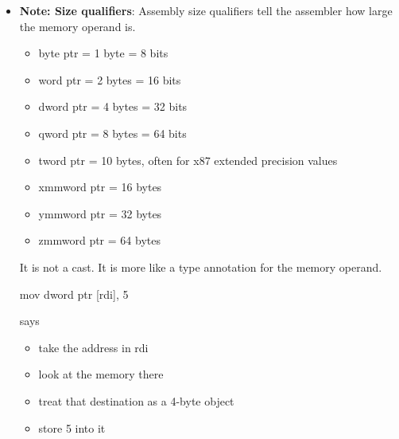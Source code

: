 \documentclass{report}
\begin{document}
\begin{itemize}
\begin{itemize}
                    \item callee fills it in
                    \item caller reads the result from that stack space
                \end{itemize}
                So the returned value lives in stack memory owned by the caller.
                \bigbreak \noindent 
                \begin{cppcode}
                    sub rsp, 32          ; reserve space for returned object
                    lea rdi, [rsp]       ; pass pointer to return slot
                    call make_big
                    ; now [rsp]..[rsp+31] contains the returned struct
                \end{cppcode}
            \item \textbf{Note: Size qualifiers}: Assembly size qualifiers tell the assembler how large the memory operand is.
                \begin{itemize}
                    \item byte ptr = 1 byte = 8 bits
                    \item word ptr = 2 bytes = 16 bits
                    \item dword ptr = 4 bytes = 32 bits
                    \item qword ptr = 8 bytes = 64 bits
                    \item tword ptr = 10 bytes, often for x87 extended precision values
                    \item xmmword ptr = 16 bytes
                    \item ymmword ptr = 32 bytes
                    \item zmmword ptr = 64 bytes
                \end{itemize}
                It is not a cast. It is more like a type annotation for the memory operand.
                \bigbreak \noindent 
                \begin{cppcode}
                mov dword ptr [rdi], 5
                \end{cppcode}
                \bigbreak \noindent 
                says
                \begin{itemize}
                    \item take the address in rdi
                    \item look at the memory there
                    \item treat that destination as a 4-byte object
                    \item store 5 into it
                \end{itemize}


        \end{itemize}
\end{document}
